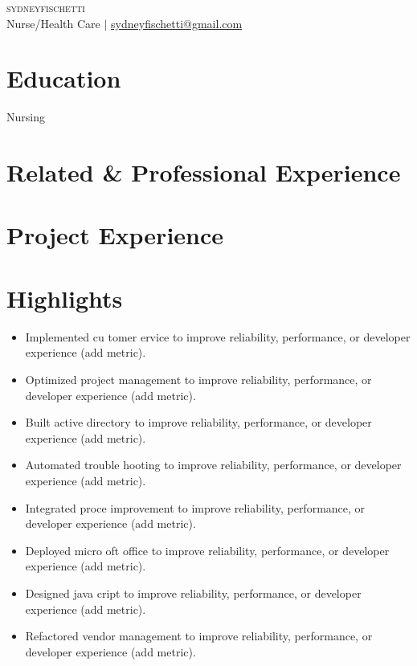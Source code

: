 \documentclass[letterpaper,11pt]{article}
\begin{document}
\begin{center}
{\Huge \scshape sydneyfischetti} \\ \vspace{1pt}
Nurse/Health Care $|$ \href{mailto:sydneyfischetti@gmail.com}{sydneyfischetti@gmail.com}
\end{center}

\section{Education}

{\small Nursing}\par

\section{Related \& Professional Experience}

{\small }\par

\section{Project Experience}

{\small }\par

\section{Highlights}
\begin{itemize}[leftmargin=0.15in]\item Implemented cu tomer  ervice to improve reliability, performance, or developer experience (add metric).
\item Optimized project management to improve reliability, performance, or developer experience (add metric).
\item Built active directory to improve reliability, performance, or developer experience (add metric).
\item Automated trouble hooting to improve reliability, performance, or developer experience (add metric).
\item Integrated proce  improvement to improve reliability, performance, or developer experience (add metric).
\item Deployed micro oft office to improve reliability, performance, or developer experience (add metric).
\item Designed java cript to improve reliability, performance, or developer experience (add metric).
\item Refactored vendor management to improve reliability, performance, or developer experience (add metric).\end{itemize}
\end{document}
